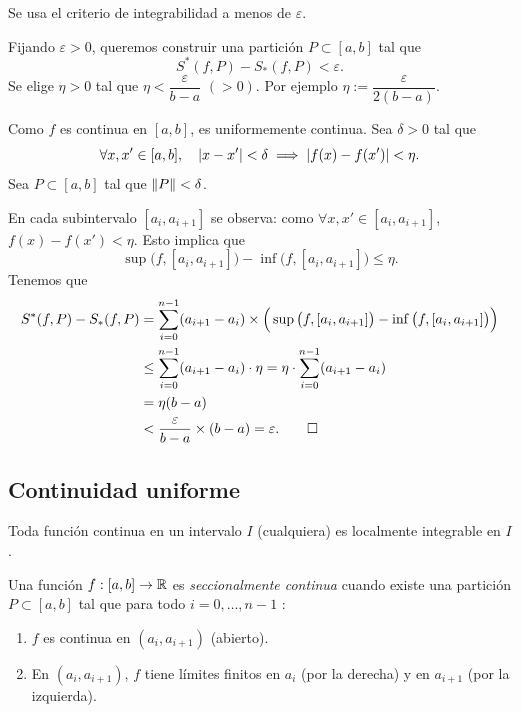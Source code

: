 \documentclass[11pt,a4paper]{article}
\begin{document}
\begin{demo}
Se usa el criterio de integrabilidad a menos de $\varepsilon$.

Fijando $\varepsilon>0$, queremos construir una partición $P\subset[a,b]$ tal que
\[
  S^*(f,P)-S_*(f,P)<\varepsilon.
\]
Se elige $\eta>0$ tal que $\eta<\dfrac{\varepsilon}{b-a}$ $(>0)$. Por ejemplo $\eta:=\dfrac{\varepsilon}{2(b-a)}$.

Como $f$ es continua en $[a,b]$, es uniformemente continua. Sea $\delta>0$ tal que
\[
  \forall x,x'\in[a,b],\quad \lvert x-x'\rvert<\delta\implies\lvert f(x)-f(x')\rvert<\eta.
\]
Sea $P\subset[a,b]$ tal que $\lVert P\rVert<\delta$.

En cada subintervalo $[a_i,a_{i+1}]$ se observa: como $\forall x,x'\in[a_i,a_{i+1}]$, $f(x)-f(x')<\eta$. Esto implica que
\[
  \sup\big(f,[a_i,a_{i+1}]\big)-\inf\big(f,[a_i,a_{i+1}]\big)\leq\eta.
\]
Tenemos que
\begin{align*}
  S^*(f,P)-S_*(f,P) &= \sum_{i=0}^{n-1}(a_{i+1}-a_i)\times\Big(\sup\big(f,[a_i,a_{i+1}]\big)-\inf\big(f,[a_i,a_{i+1}]\big)\Big)\\
  &\leq \sum_{i=0}^{n-1}(a_{i+1}-a_i)\cdot\eta = \eta\cdot\sum_{i=0}^{n-1}(a_{i+1}-a_i)\\
  &= \eta(b-a)\\
  &< \frac{\varepsilon}{b-a}\times(b-a)=\varepsilon. \qedhere
\end{align*}
\end{demo}



\subsection{Continuidad uniforme}

\begin{corolario}
Toda función continua en un intervalo $I$ (cualquiera) es localmente integrable en $I$.
\end{corolario}

\begin{definicion}
Una función $f:[a,b]\to\mathbb{R}$ es \emph{seccionalmente continua} cuando existe una partición $P\subset[a,b]$ tal que para todo $i=0,\dots,n-1$ :
\begin{enumerate}[label=(\arabic*)]
  \item $f$ es continua en $(a_i,a_{i+1})$ (abierto).
  \item En $(a_i,a_{i+1})$, $f$ tiene límites finitos en $a_i$ (por la derecha) y en $a_{i+1}$ (por la izquierda).
\end{enumerate}
\end{definicion}
\end{document}
